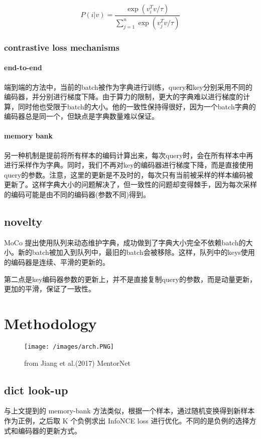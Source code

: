 $$
P(i|v)=\frac{\exp(v_i^Tv/\tau)}{\sum_{j=1}^{n}{\exp(v_j^Tv/\tau)}}
$$

\subsubsection{contrastive loss mechanisms}

\paragraph*{end-to-end}
端到端的方法中，当前的batch被作为字典进行训练，query和key分别采用不同的编码器，并分别进行梯度下降。由于算力的限制，更大的字典难以进行梯度的计算，同时他也受限于batch的大小。他的一致性保持得很好，因为一个batch字典的编码器总是同一个，但缺点是字典数量难以保证。
\paragraph*{memory bank}
另一种机制是提前将所有样本的编码计算出来，每次query时，会在所有样本中再进行采样作为字典。同时，我们不再对key的编码器进行梯度下降，而是直接使用query的参数。注意，这里的更新是不及时的，每次只有当前被采样的样本编码被更新了。这样字典大小的问题解决了，但一致性的问题却变得棘手，因为每次采样的编码可能是由不同的编码器(参数不同)得到。

\subsection{novelty}

MoCo 提出使用队列来动态维护字典，成功做到了字典大小完全不依赖batch的大小。新的batch被加入到队列中，最旧的batch会被移除。这样，队列中的keys使用的编码器是连续、平滑的更新的。

第二点是key编码器参数的更新上，并不是直接复制query的参数，而是动量更新，更加的平滑，保证了一致性。

\section{Methodology}

\begin{figure}
	\texttt{[image: /images/arch.PNG]}
	\caption{from Jiang et al.(2017) MentorNet}
\end{figure}

\subsection{dict look-up}
与上文提到的 memory-bank 方法类似，根据一个样本，通过随机变换得到新样本作为正例，之后取 K 个负例求出 InfoNCE loss 进行优化。不同的是负例的选择方式和编码器的更新方式。

